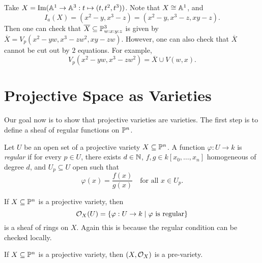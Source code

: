 \begin{example}
  Take $X = \operatorname{Im}(\mathbb{A}^1 \to \mathbb{A}^3 : t \mapsto (t, t^2, t^3))$.
  Note that $X \cong \mathbb{A}^1$, and
  \[
    I_a(X)
    = (x^2 - y, x^3 - z)
    = (x^2 - y, x^3 - z, xy - z).
  \]
  Then one can check
  that
  $\overline{X} \subseteq \mathbb{P}^3_{w : x : y : z}$
  is given by
  $\overline{X} = V_p(x^2 - yw, x^3 - zw^2, xy - zw)$.
  However, one can also check that
  $\overline{X}$ cannot be
  cut out by $2$ equations.
  For example,
  \[
    V_p(x^2 - yw, x^3 - zw^2)
    = \overline{X} \cup V(w, x).
  \]
\end{example}

\section{Projective Space as Varieties}

\begin{remark}
  Our goal now is to show that
  projective varieties are varieties.
  The first step is to define a sheaf
  of regular functions on $\mathbb{P}^n$.
\end{remark}

\begin{definition}
  Let $U$ be an open set of a
  projective variety $X \subseteq \mathbb{P}^n$.
  A function $\varphi : U \to k$
  is \emph{regular} if for every $p \in U$,
  there exists $d \in \mathbb{N}$,
  $f, g \in k[x_0, \dots, x_n]$
  homogeneous of degree $d$, and
  $U_p \subseteq U$ open such that
  \[
    \varphi(x) = \frac{f(x)}{g(x)}
    \quad \text{for all } x \in U_p.
  \]
\end{definition}

\begin{remark}
  If $X \subseteq \mathbb{P}^n$ is a projective
  variety, then
  \[
    \mathcal{O}_X(U)
    = \{\varphi : U \to k \mid \varphi \text{ is regular}\}
  \]
  is a sheaf of rings on $X$.
  Again this is because the regular
  condition can be checked locally.
\end{remark}

\begin{prop}
  If $X \subseteq \mathbb{P}^n$ is a projective
  variety, then
  $(X, \mathcal{O}_X)$ is a pre-variety.
\end{prop}

